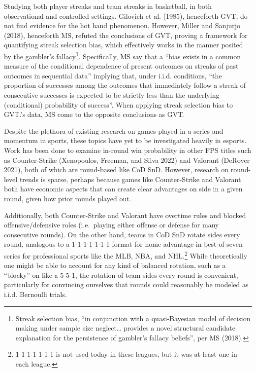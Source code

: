 \documentclass{article}
\begin{document}
Studying both player streaks and team streaks in basketball, in both
observational and controlled settings. Gilovich et al. (1985),
henceforth GVT, do not find evidence for the hot hand phenomenon.
However, Miller and Sanjurjo (2018), henceforth MS, refuted the
conclusions of GVT, proving a framework for quantifying streak selection
bias, which effectively works in the manner posited by the gambler's
fallacy\footnote{Streak selection bias, ``in conjunction with a
  quasi-Bayesian model of decision making under sample size
  neglect\ldots{} provides a novel structural candidate explanation for
  the persistence of gambler's fallacy beliefs'', per MS (2018).}.
Specifically, MS say that a ``bias exists in a common measure of the
conditional dependence of present outcomes on streaks of past outcomes
in sequential data'' implying that, under i.i.d. conditions, ``the
proportion of successes among the outcomes that immediately follow a
streak of consecutive successes is expected to be strictly less than the
underlying (conditional) probability of success''. When applying streak
selection bias to GVT.'s data, MS come to the opposite conclusions as
GVT.

Despite the plethora of existing research on games played in a series
and momentum in sports, these topics have yet to be investigated heavily
in esports. Work has been done to examine in-round win probability in
other FPS titles such as Counter-Strike (Xenopoulos, Freeman, and Silva
2022) and Valorant (DeRover 2021), both of which are round-based like
CoD SnD. However, research on round-level trends is sparse, perhaps
because games like Counter-Strike and Valorant both have economic
aspects that can create clear advantages on side in a given round, given
how prior rounds played out.

Additionally, both Counter-Strike and Valorant have overtime rules and
blocked offensive/defensive roles (i.e.~playing either offense or
defense for many consecutive rounds). On the other hand, teams in CoD
SnD rotate sides every round, analogous to a 1-1-1-1-1-1-1 format for
home advantage in best-of-seven series for professional sports like the
MLB, NBA, and NHL.\footnote{1-1-1-1-1-1-1 is not used today in these
  leagues, but it was at least one in each league.} While theoretically
one might be able to account for any kind of balanced rotation, such as
a ``blocky'' on like a 5-5-1, the rotation of team sides every round is
convenient, particularly for convincing ourselves that rounds could
reasonably be modeled as i.i.d. Bernoulli trials.
\end{document}
